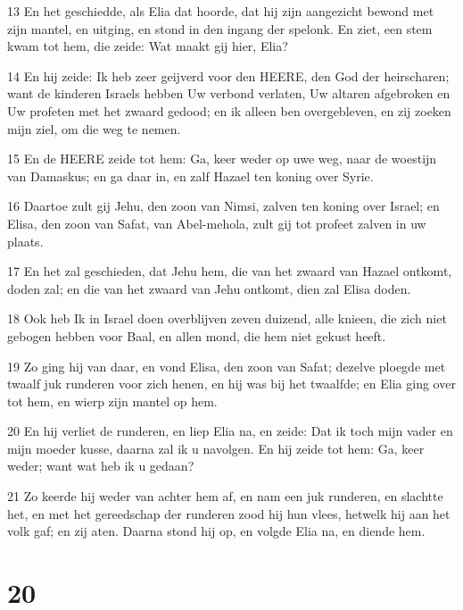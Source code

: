 \par 13 En het geschiedde, als Elia dat hoorde, dat hij zijn aangezicht bewond met zijn mantel, en uitging, en stond in den ingang der spelonk. En ziet, een stem kwam tot hem, die zeide: Wat maakt gij hier, Elia?
\par 14 En hij zeide: Ik heb zeer geijverd voor den HEERE, den God der heirscharen; want de kinderen Israels hebben Uw verbond verlaten, Uw altaren afgebroken en Uw profeten met het zwaard gedood; en ik alleen ben overgebleven, en zij zoeken mijn ziel, om die weg te nemen.
\par 15 En de HEERE zeide tot hem: Ga, keer weder op uwe weg, naar de woestijn van Damaskus; en ga daar in, en zalf Hazael ten koning over Syrie.
\par 16 Daartoe zult gij Jehu, den zoon van Nimsi, zalven ten koning over Israel; en Elisa, den zoon van Safat, van Abel-mehola, zult gij tot profeet zalven in uw plaats.
\par 17 En het zal geschieden, dat Jehu hem, die van het zwaard van Hazael ontkomt, doden zal; en die van het zwaard van Jehu ontkomt, dien zal Elisa doden.
\par 18 Ook heb Ik in Israel doen overblijven zeven duizend, alle knieen, die zich niet gebogen hebben voor Baal, en allen mond, die hem niet gekust heeft.
\par 19 Zo ging hij van daar, en vond Elisa, den zoon van Safat; dezelve ploegde met twaalf juk runderen voor zich henen, en hij was bij het twaalfde; en Elia ging over tot hem, en wierp zijn mantel op hem.
\par 20 En hij verliet de runderen, en liep Elia na, en zeide: Dat ik toch mijn vader en mijn moeder kusse, daarna zal ik u navolgen. En hij zeide tot hem: Ga, keer weder; want wat heb ik u gedaan?
\par 21 Zo keerde hij weder van achter hem af, en nam een juk runderen, en slachtte het, en met het gereedschap der runderen zood hij hun vlees, hetwelk hij aan het volk gaf; en zij aten. Daarna stond hij op, en volgde Elia na, en diende hem.

\chapter{20}

